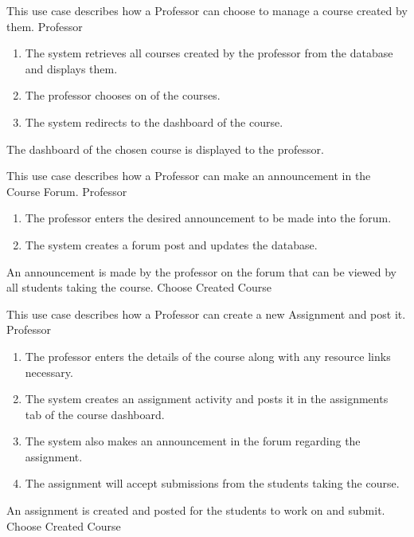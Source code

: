 \documentclass[12pt, a4]{report}
\begin{document}

{ %
This use case describes how a Professor can choose to manage a course created by them.
}
{ %
Professor
}
{ %
\begin{enumerate}
    \item The system retrieves all courses created by the professor from the database and displays them.
    \item The professor chooses on of the courses.
    \item The system redirects to the dashboard of the course.
\end{enumerate}
}
{ %
}
{ %
}
{ %
The dashboard of the chosen course is displayed to the professor.
}
{ %
}
{ %
}


{ %
This use case describes how a Professor can make an announcement in the Course Forum.
}
{ %
Professor
}
{ %
\begin{enumerate}
    \item The professor enters the desired announcement to be made into the forum.
    \item The system creates a forum post and updates the database.
\end{enumerate}
}
{ %
}
{ %
}
{ %
An announcement is made by the professor on the forum that can be viewed by all students taking the course.
}
{ %
Choose Created Course
}
{ %
}


{ %
This use case describes how a Professor can create a new Assignment and post it.
}
{ %
Professor
}
{ %
\begin{enumerate}
    \item The professor enters the details of the course along with any resource links necessary.
    \item The system creates an assignment activity and posts it in the assignments tab of the course dashboard.
    \item The system also makes an announcement in the forum regarding the assignment.
    \item The assignment will accept submissions from the students taking the course.
\end{enumerate}
}
{ %
}
{ %
}
{ %
An assignment is created and posted for the students to work on and submit.
}
{ %
Choose Created Course
}
{ %
}
\end{document}
